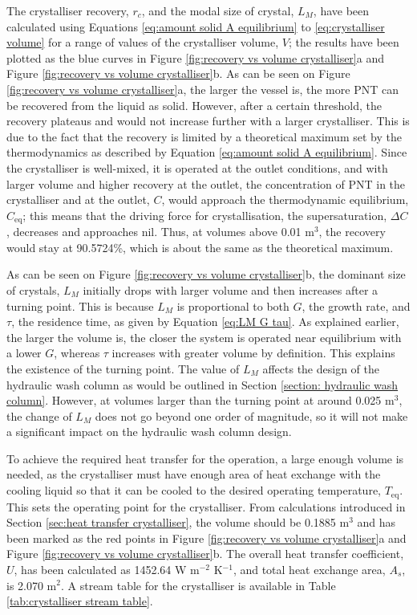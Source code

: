 \noindent The crystalliser recovery, $r_c$, and the modal size of crystal, $L_M$, have been calculated using Equations \ref{eq:amount solid A equilibrium} to \ref{eq:crystalliser volume} for a range of values of the crystalliser volume, $V$; the results have been plotted as the blue curves in Figure \ref{fig:recovery vs volume crystalliser}a and Figure \ref{fig:recovery vs volume crystalliser}b. As can be seen on Figure \ref{fig:recovery vs volume crystalliser}a, the larger the vessel is, the more PNT can be recovered from the liquid as solid. However, after a certain threshold, the recovery plateaus and would not increase further with a larger crystalliser. This is due to the fact that the recovery is limited by a theoretical maximum set by the thermodynamics as described by Equation \ref{eq:amount solid A equilibrium}. Since the crystalliser is well-mixed, it is operated at the outlet conditions, and with larger volume and higher recovery at the outlet, the concentration of PNT in the crystalliser and at the outlet, $C$, would approach the thermodynamic equilibrium, $C_{\mathrm{eq}}$; this means that the driving force for crystallisation, the supersaturation, $\Delta C$, decreases and approaches nil. Thus, at volumes above 0.01 m$^{3}$, the recovery would stay at 90.5724\%, which is about the same as the theoretical maximum.

As can be seen on Figure \ref{fig:recovery vs volume crystalliser}b, the dominant size of crystals, $L_M$ initially drops with larger volume and then increases after a turning point. This is because $L_M$ is proportional to both $G$, the growth rate, and $\tau$, the residence time, as given by Equation \ref{eq:LM G tau}. As explained earlier, the larger the volume is, the closer the system is operated near equilibrium with a lower $G$, whereas $\tau$ increases with greater volume by definition. This explains the existence of the turning point. The value of $L_M$ affects the design of the hydraulic wash column as would be outlined in Section \ref{section: hydraulic wash column}. However, at volumes larger than the turning point at around 0.025 m$^3$, the change of $L_M$ does not go beyond one order of magnitude, so it will not make a significant impact on the hydraulic wash column design. 

To achieve the required heat transfer for the operation, a large enough volume is needed, as the crystalliser must have enough area of heat exchange with the cooling liquid so that it can be cooled to the desired operating temperature, $T_{\mathrm{eq}}$. This sets the operating point for the crystalliser. From calculations introduced in Section \ref{sec:heat transfer crystalliser}, the volume should be 0.1885 m$^3$ and has been marked as the red points in Figure \ref{fig:recovery vs volume crystalliser}a and Figure \ref{fig:recovery vs volume crystalliser}b. The overall heat transfer coefficient,$U$, has been calculated as 1452.64 W m$^{-2}$ K$^{-1}$, and total heat exchange area, $A_s$, is 2.070 m$^2$. A stream table for the crystalliser is available in Table \ref{tab:crystalliser stream table}.

